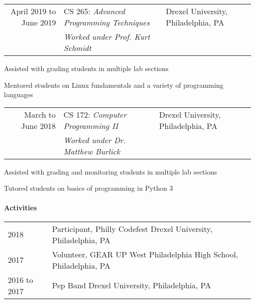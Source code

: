 \documentclass[10pt,]{article}
\let\oldparagraph\paragraph
\renewcommand{\paragraph}[1]{\oldparagraph{#1}\mbox{}}
\begin{document}
\begin{tabularx}{\textwidth}{r | l X}
April 2019 to June 2019 & CS 265: \textit{Advanced Programming Techniques} & \hfill Drexel University, Philadelphia, PA\\
           & \textit{Worked under Prof. Kurt Schmidt}
\end{tabularx}
\begin{list}{\quad}
    \item Assisted with grading students in multiple lab sections
    \item Mentored students on Linux fundamentals and a variety of programming languages
\end{list}

\begin{tabularx}{\textwidth}{r | l X}
March to June 2018 & CS 172: \textit{Computer Programming II} & \hfill Drexel University, Philadelphia, PA\\
           & \textit{Worked under Dr. Matthew Burlick}
\end{tabularx}
\begin{list}{\quad}
    \item Assisted with grading and monitoring students in multiple lab sections
    \item Tutored students on basics of programming in Python 3
\end{list}

\hypertarget{activities}{%
\paragraph{Activities}\label{activities}}

\begin{tabularx}{\textwidth}{l | X}
    2018         & Participant, Philly Codefest \hfill Drexel University, Philadelphia, PA\\
    2017         & Volunteer, GEAR UP \hfill West Philadelphia High School, Philadelphia, PA\\
    2016 to 2017 & Pep Band \hfill Drexel University, Philadelphia, PA
\end{tabularx}
\end{document}
